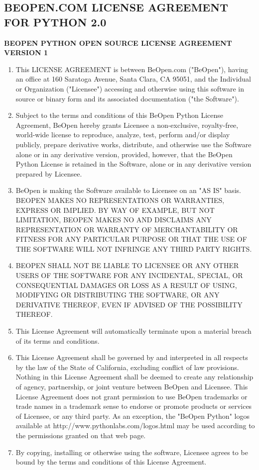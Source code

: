 \subsection{BEOPEN.COM LICENSE AGREEMENT FOR PYTHON 2.0}

\textbf{BEOPEN PYTHON OPEN SOURCE LICENSE AGREEMENT VERSION 1}

\begin{enumerate}
\item This LICENSE AGREEMENT is between BeOpen.com ("BeOpen"), having an
office at 160 Saratoga Avenue, Santa Clara, CA 95051, and the
Individual or Organization ("Licensee") accessing and otherwise using
this software in source or binary form and its associated
documentation ("the Software").

\item Subject to the terms and conditions of this BeOpen Python License
Agreement, BeOpen hereby grants Licensee a non-exclusive,
royalty-free, world-wide license to reproduce, analyze, test, perform
and/or display publicly, prepare derivative works, distribute, and
otherwise use the Software alone or in any derivative version,
provided, however, that the BeOpen Python License is retained in the
Software, alone or in any derivative version prepared by Licensee.

\item BeOpen is making the Software available to Licensee on an "AS IS"
basis.  BEOPEN MAKES NO REPRESENTATIONS OR WARRANTIES, EXPRESS OR
IMPLIED.  BY WAY OF EXAMPLE, BUT NOT LIMITATION, BEOPEN MAKES NO AND
DISCLAIMS ANY REPRESENTATION OR WARRANTY OF MERCHANTABILITY OR FITNESS
FOR ANY PARTICULAR PURPOSE OR THAT THE USE OF THE SOFTWARE WILL NOT
INFRINGE ANY THIRD PARTY RIGHTS.

\item BEOPEN SHALL NOT BE LIABLE TO LICENSEE OR ANY OTHER USERS OF THE
SOFTWARE FOR ANY INCIDENTAL, SPECIAL, OR CONSEQUENTIAL DAMAGES OR LOSS
AS A RESULT OF USING, MODIFYING OR DISTRIBUTING THE SOFTWARE, OR ANY
DERIVATIVE THEREOF, EVEN IF ADVISED OF THE POSSIBILITY THEREOF.

\item This License Agreement will automatically terminate upon a material
breach of its terms and conditions.

\item This License Agreement shall be governed by and interpreted in all
respects by the law of the State of California, excluding conflict of
law provisions.  Nothing in this License Agreement shall be deemed to
create any relationship of agency, partnership, or joint venture
between BeOpen and Licensee.  This License Agreement does not grant
permission to use BeOpen trademarks or trade names in a trademark
sense to endorse or promote products or services of Licensee, or any
third party.  As an exception, the "BeOpen Python" logos available at
http://www.pythonlabs.com/logos.html may be used according to the
permissions granted on that web page.

\item By copying, installing or otherwise using the software, Licensee
agrees to be bound by the terms and conditions of this License
Agreement.
\end{enumerate}


